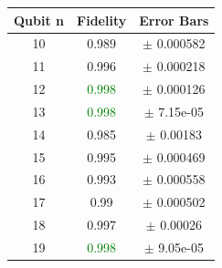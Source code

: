 \documentclass[9pt,a4paper]{src/templates/tau-class/tau}
\begin{document}
\begin{minipage}{0.48\textwidth}
\begin{minipage}[t]{0.48\linewidth}
\begin{center}
\begin{tabular}{@{}c c c@{}}
\bottomrule
\end{tabular}
\end{center}
\end{minipage}%
\hfill%
\begin{minipage}[t]{0.48\linewidth}
\begin{center}
\begin{tabular}{@{}c c c@{}}
\toprule
Qubit n & Fidelity & Error Bars \\ \midrule






















10 & 0.989 & $\pm$ 0.000582 \\



11 & 0.996 & $\pm$ 0.000218 \\



12 & \textcolor{green}{0.998} & $\pm$ 0.000126 \\



13 & \textcolor{green}{0.998} & $\pm$ 7.15e-05 \\



14 & 0.985 & $\pm$ 0.00183 \\



15 & 0.995 & $\pm$ 0.000469 \\



16 & 0.993 & $\pm$ 0.000558 \\



17 & 0.99 & $\pm$ 0.000502 \\



18 & 0.997 & $\pm$ 0.00026 \\



19 & \textcolor{green}{0.998} & $\pm$ 9.05e-05 \\


\bottomrule
\end{tabular}
\end{center}
\end{minipage}
\end{minipage}%
\end{document}
